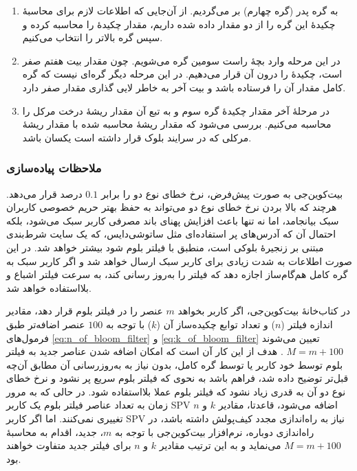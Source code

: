 \begin{enumerate}
	\item{%
	به گره پدر (گره چهارم) بر می‌گردیم. از آن‌جایی که اطلاعات لازم برای محاسبهٔ چکیدهٔ این گره را از دو مقدار   داده شده داریم، مقدار چکیدهٔ را محاسبه کرده و سپس گره بالاتر را انتخاب می‌کنیم. 
}
	\item{%
	در این مرحله وارد بچهٔ راست سومین گره می‌شویم. چون مقدار بیت هفتم  صفر است، چکیدهٔ  را درون آن قرار می‌دهیم. در این مرحله دیگر گره‌ای نیست که گره کامل مقدار آن را فرستاده باشد و بیت آخر  به خاطر لایی گذاری مقدار صفر دارد. 
}
	\item{%
	در مرحلهٔ آخر مقدار چکیدهٔ گره سوم و به تبع آن مقدار ریشهٔ درخت مرکل را محاسبه می‌کنیم. بررسی می‌شود که مقدار ریشهٔ محاسبه شده با مقدار ریشهٔ مرکلی که در سرایند بلوک قرار داشته است یکسان باشد.
}
\end{enumerate}


\subsubsection{ملاحظات پیاده‌سازی}
بیت‌کوین‌جی\cite{bitcoinj} به صورت پیش‌فرض، نرخ خطای نوع دو را برابر $0.1$ درصد قرار می‌دهد. هرچند که بالا بردن نرخ خطای نوع دو می‌تواند به حفظ بهتر حریم خصوصی کاربران سبک بیانجامد، اما نه تنها باعث افزایش پهنای باند مصرفی کاربر سبک می‌شود، بلکه احتمال آن که آدرس‌های پر استفاده‌ای مثل 
ساتوشی‌دایس،
که یک سایت شرط‌بندی مبتنی بر زنجیرهٔ بلوکی است، منطبق با فیلتر بلوم شود بیشتر خواهد شد. در این صورت اطلاعات به شدت زیادی برای کاربر سبک ارسال خواهد شد و اگر کاربر سبک به گره کامل هم‌گام‌ساز اجازه دهد که فیلتر را به‌روز رسانی کند، به سرعت فیلتر اشباع و بلااستفاده خواهد شد.
 
در کتاب‌خانهٔ بیت‌کوین‌جی، اگر کاربر بخواهد $m$ عنصر را در فیلتر بلوم قرار دهد، مقادیر اندازه فیلتر ($n$) و تعداد توابع چکیده‌ساز آن ($k$) با توجه به $100$ عنصر اضافه‌تر طبق فرمول‌های \eqref{eq:n_of_bloom_filter} و \eqref{eq:k_of_bloom_filter} تعیین می‌شوند 
$M=m+100$ \cite{Gervais2014}.
 هدف از این کار آن است که امکان اضافه شدن عناصر جدید به فیلتر بلوم توسط خود کاربر یا توسط گره کامل، بدون نیاز به به‌روزرسانی آن مطابق آن‌چه قبل‌تر توضیح داده شد، فراهم باشد به نحوی که فیلتر بلوم سریع پر نشود و نرخ خطای نوع دو آن به قدری زیاد نشود که فیلتر بلوم عملا بلااستفاده شود. در حالی که به مرور زمان به تعداد عناصر فیلتر بلوم یک کاربر SPV اضافه می‌شود، قاعدتا، مقادیر $k$ و $n$ تغییری نمی‌کنند. اما اگر کاربر SPV نیاز به راه‌اندازی مجدد کیف‌پولش داشته باشد، در راه‌اندازی دوباره، نرم‌افزار بیت‌کوین‌جی با توجه به $m$، جدید، اقدام به محاسبهٔ $M=m+100$ می‌نماید و به این ترتیب مقادیر  $k$ و $n$ برای فیلتر جدید متفاوت خواهند بود.
 
